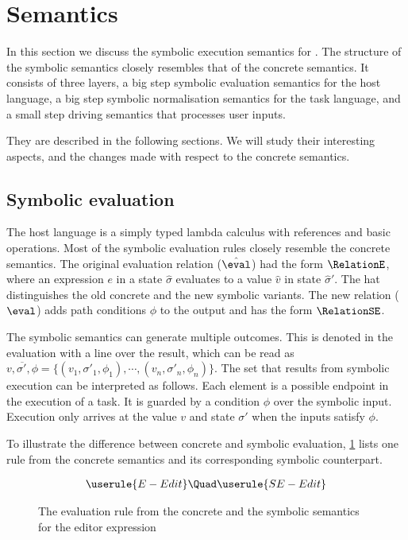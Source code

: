 
\section{Semantics}
\label{sec:semantics}

In this section we discuss the symbolic execution semantics for \TOPHAT.
The structure of the symbolic semantics closely resembles that of the concrete semantics.
It consists of three layers, a big step symbolic evaluation semantics for the host language, a big step symbolic normalisation semantics for the task language, and a small step driving semantics that processes user inputs.

They are described in the following sections.
We will study their interesting aspects, and the changes made with respect to the concrete semantics.



\subsection{Symbolic evaluation}

The host language is a simply typed lambda calculus with references and basic operations.
Most of the symbolic evaluation rules closely resemble the concrete semantics.
The original evaluation relation ($\hat{\eval}$) had the form $\RelationE$,
where an expression $e$ in a state $\hat{\sigma}$ evaluates to a value $\hat{v}$ in state $\hat{\sigma}'$.
The hat distinguishes the old concrete and the new symbolic variants.
The new relation ($\eval$) adds path conditions $\phi$ to the output and has the form $\RelationSE$.

The symbolic semantics can generate multiple outcomes.
This is denoted in the evaluation with a line over the result, which can be read as $\overline{v,\sigma',\phi} = \{(v_1,\sigma'_1,\phi_1),\cdots,(v_n,\sigma'_n,\phi_n)\}$.
The set that results from symbolic execution can be interpreted as follows.
Each element is a possible endpoint in the execution of a task.
It is guarded by a condition $\phi$ over the symbolic input.
Execution only arrives at the value $v$ and state $\sigma'$ when the inputs satisfy $\phi$.

To illustrate the difference between concrete and symbolic evaluation, \cref{fig:oldToNewSemantics} lists one rule from the concrete semantics and its corresponding symbolic counterpart.

\begin{figure}[h]
  \small
  \begin{gather*}
    \userule{E-Edit}\Quad
    \userule{SE-Edit}
  \end{gather*}
  \caption{The evaluation rule from the concrete and the symbolic semantics for the editor expression}
  \label{fig:oldToNewSemantics}
\end{figure}

